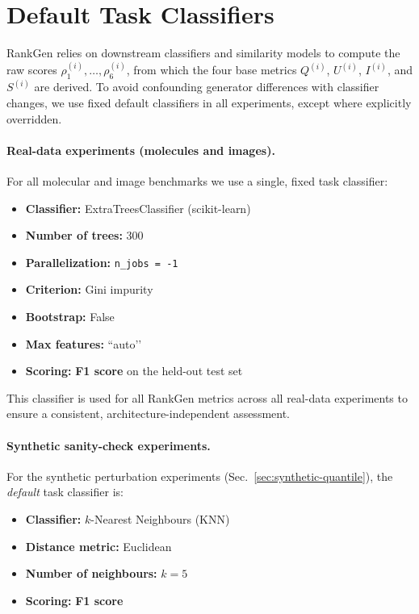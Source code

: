 \section{Default Task Classifiers}
\label{appendix:default-classifiers}

RankGen relies on downstream classifiers and similarity models to compute the
raw scores $\rho^{(i)}_1,\ldots,\rho^{(i)}_6$, from which the four base metrics
$Q^{(i)}$, $U^{(i)}$, $I^{(i)}$, and $S^{(i)}$ are derived. 
To avoid confounding generator differences with classifier changes, we
use fixed default classifiers in all experiments, except where explicitly
overridden.

\paragraph{Real-data experiments (molecules and images).}
For all molecular and image benchmarks we use a single, fixed
task classifier:

\begin{itemize}
    \item \textbf{Classifier:} ExtraTreesClassifier (scikit-learn)
    \item \textbf{Number of trees:} 300
    \item \textbf{Parallelization:} \texttt{n\_jobs = -1}
    \item \textbf{Criterion:} Gini impurity
    \item \textbf{Bootstrap:} False
    \item \textbf{Max features:} “auto’’
    \item \textbf{Scoring:} \textbf{F1 score} on the held-out test set
\end{itemize}

This classifier is used for all RankGen metrics across all real-data
experiments to ensure a consistent, architecture-independent
assessment.

\paragraph{Synthetic sanity-check experiments.}
For the synthetic perturbation experiments (Sec.~\ref{sec:synthetic-quantile}),
the \emph{default} task classifier is:

\begin{itemize}
    \item \textbf{Classifier:} $k$-Nearest Neighbours (KNN)
    \item \textbf{Distance metric:} Euclidean
    \item \textbf{Number of neighbours:} $k=5$
    \item \textbf{Scoring:} \textbf{F1 score}
\end{itemize}


